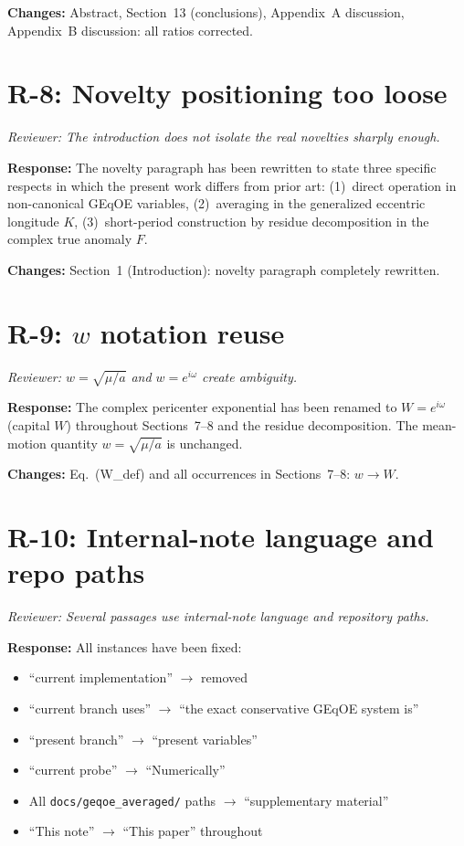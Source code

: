 \documentclass[11pt]{article}
\newcommand{\rev}[1]{\textcolor{revcolor}{\emph{#1}}}
\begin{document}
\textbf{Changes:} Abstract, Section~13 (conclusions), Appendix~A
discussion, Appendix~B discussion: all ratios corrected.

\section*{R-8: Novelty positioning too loose}

\rev{Reviewer: The introduction does not isolate the real novelties
sharply enough.}

\textbf{Response:} The novelty paragraph has been rewritten to state three
specific respects in which the present work differs from prior art:
(1)~direct operation in non-canonical GEqOE variables,
(2)~averaging in the generalized eccentric longitude $K$,
(3)~short-period construction by residue decomposition in the complex true
anomaly $F$.

\textbf{Changes:} Section~1 (Introduction): novelty paragraph completely
rewritten.

\section*{R-9: $w$ notation reuse}

\rev{Reviewer: $w = \sqrt{\mu/a}$ and $w = e^{i\omega}$ create ambiguity.}

\textbf{Response:} The complex pericenter exponential has been renamed to
$W = e^{i\omega}$ (capital $W$) throughout Sections~7--8 and the residue
decomposition. The mean-motion quantity $w = \sqrt{\mu/a}$ is unchanged.

\textbf{Changes:} Eq.~(W\_def) and all occurrences in Sections~7--8:
$w \to W$.

\section*{R-10: Internal-note language and repo paths}

\rev{Reviewer: Several passages use internal-note language and repository
paths.}

\textbf{Response:} All instances have been fixed:
\begin{itemize}[nosep]
\item ``current implementation'' $\to$ removed
\item ``current branch uses'' $\to$ ``the exact conservative GEqOE system is''
\item ``present branch'' $\to$ ``present variables''
\item ``current probe'' $\to$ ``Numerically''
\item All \texttt{docs/geqoe\_averaged/} paths $\to$ ``supplementary material''
\item ``This note'' $\to$ ``This paper'' throughout
\end{itemize}
\end{document}
